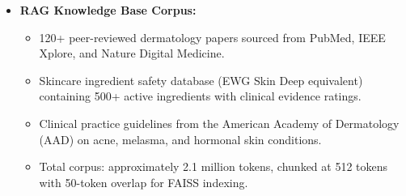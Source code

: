 \begin{itemize}
    \item \textbf{RAG Knowledge Base Corpus:}
    \begin{itemize}[label=$\diamond$]
        \item 120+ peer-reviewed dermatology papers sourced from PubMed, IEEE Xplore, and Nature Digital Medicine.
        \item Skincare ingredient safety database (EWG Skin Deep equivalent) containing 500+ active ingredients with clinical evidence ratings.
        \item Clinical practice guidelines from the American Academy of Dermatology (AAD) on acne, melasma, and hormonal skin conditions.
        \item Total corpus: approximately 2.1 million tokens, chunked at 512 tokens with 50-token overlap for FAISS indexing.
    \end{itemize}
    \vspace{0.5cm}
\end{itemize}

